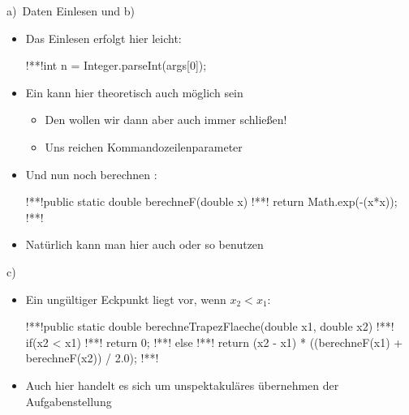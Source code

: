 \begin{frame}[fragile]{a)~Daten Einlesen und b)~}
    \begin{itemize}[<+(1)->]
        \item Das Einlesen erfolgt hier leicht:
\begin{plainjava}[aboveskip=0pt]
!**!int n = Integer.parseInt(args[0]);
\end{plainjava}
        \item Ein  kann hier theoretisch auch möglich sein \begin{itemize}
            \item Den wollen wir dann aber auch immer schließen!
            \item Uns reichen Kommandozeilenparameter
        \end{itemize}
        \item Und nun noch berechnen :
\begin{plainjava}
!**!public static double berechneF(double x) {
!**!    return Math.exp(-(x*x));
!**!}
\end{plainjava}
        \item<10-> Natürlich kann man hier auch  oder so benutzen
    \end{itemize}
\end{frame}

\begin{frame}[fragile]{c)~}
    \begin{itemize}[<+(1)->]
        \item Ein ungültiger Eckpunkt liegt vor, wenn \(x_2 < x_1\):
\begin{plainjava}
!**!public static double berechneTrapezFlaeche(double x1, double x2) {
!**!    if(x2 < x1)
!**!        return 0;
!**!    else
!**!        return (x2 - x1) * ((berechneF(x1) + berechneF(x2)) / 2.0);
!**!}
\end{plainjava}
        \item Auch hier handelt es sich um unspektakuläres übernehmen der Aufgabenstellung
    \end{itemize}
\end{frame}

